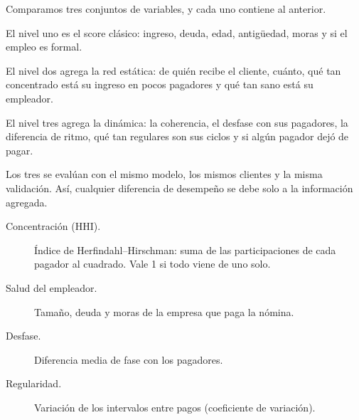 \begin{decir}
Comparamos tres conjuntos de variables, y cada uno contiene al anterior.

El nivel uno es el score clásico: ingreso, deuda, edad, antigüedad, moras y si el empleo
es formal.

El nivel dos agrega la red estática: de quién recibe el cliente, cuánto, qué tan
concentrado está su ingreso en pocos pagadores y qué tan sano está su empleador.

El nivel tres agrega la dinámica: la coherencia, el desfase con sus pagadores, la
diferencia de ritmo, qué tan regulares son sus ciclos y si algún pagador dejó de pagar.

Los tres se evalúan con el mismo modelo, los mismos clientes y la misma validación.
Así, cualquier diferencia de desempeño se debe solo a la información agregada.
\end{decir}
\begin{terminos}
\begin{description}
\item[Concentración (HHI).] Índice de Herfindahl–Hirschman: suma de las participaciones
de cada pagador al cuadrado. Vale 1 si todo viene de uno solo.
\item[Salud del empleador.] Tamaño, deuda y moras de la empresa que paga la nómina.
\item[Desfase.] Diferencia media de fase con los pagadores.
\item[Regularidad.] Variación de los intervalos entre pagos (coeficiente de variación).
\end{description}
\end{terminos}

